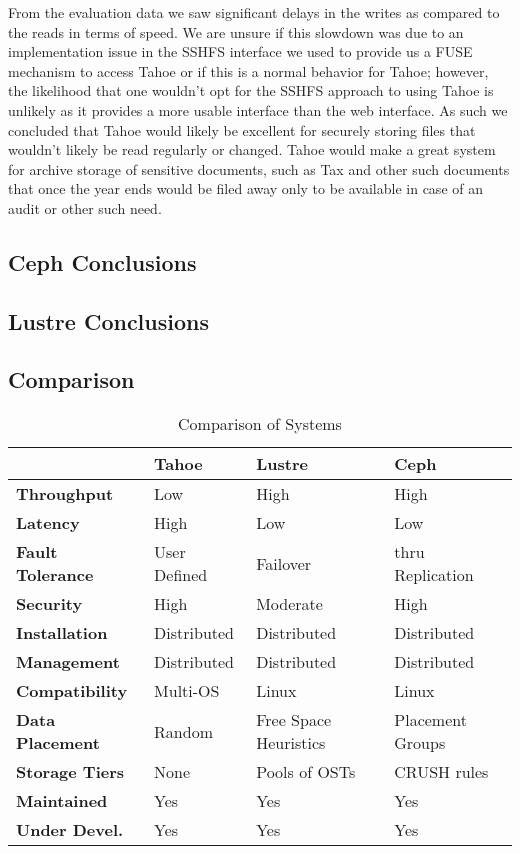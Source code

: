 \documentclass[11pt]{article}
\begin{document}
From the evaluation data we saw significant delays in the writes as
compared to the reads in terms of speed. We are unsure if this
slowdown was due to an implementation issue in the SSHFS interface we
used to provide us a FUSE mechanism to access Tahoe or if this is a
normal behavior for Tahoe; however, the likelihood that one wouldn't
opt for the SSHFS approach to using Tahoe is unlikely as it provides a
more usable interface than the web interface. As such we concluded
that Tahoe would likely be excellent for securely storing files that
wouldn't likely be read regularly or changed. Tahoe would make a great
system for archive storage of sensitive documents, such as Tax and
other such documents that once the year ends would be filed away only
to be available in case of an audit or other such need.

\subsection{Ceph Conclusions}

\subsection{Lustre Conclusions}

\subsection{Comparison}
\begin{table}
  \begin{center}
    \begin{tabularx}{\textwidth}{|X|X|X|X|}
      \hline
      {\bf } & {\bf Tahoe} & {\bf Lustre} & {\bf Ceph} \\ \hline
      {\bf Throughput} & Low & High & High \\ \hline
      {\bf Latency} & High & Low & Low \\ \hline
      {\bf Fault Tolerance} & User Defined & Failover & thru Replication \\ \hline
       {\bf Security} & High & Moderate & High \\ \hline
       {\bf Installation} & Distributed & Distributed & Distributed \\ \hline
       {\bf Management} & Distributed & Distributed & Distributed \\ \hline
       {\bf Compatibility} & Multi-OS & Linux & Linux \\ \hline
       {\bf Data Placement} & Random & Free Space Heuristics & Placement Groups \\ \hline
       {\bf Storage Tiers} & None & Pools of OSTs & CRUSH rules \\ \hline
       {\bf Maintained} & Yes & Yes & Yes \\ \hline
        {\bf Under Devel.} & Yes & Yes & Yes \\ \hline
    \end{tabularx}
    \caption{Comparison of Systems}
    \label{tbl:compare}
  \end{center}
\end{table}
\end{document}
